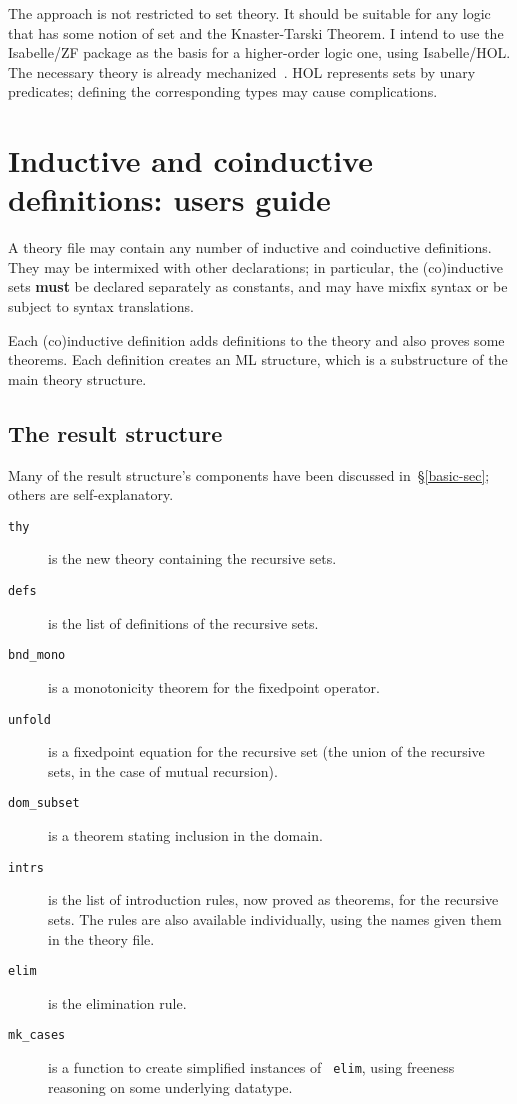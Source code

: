 The approach is not restricted to set theory.  It should be suitable for
any logic that has some notion of set and the Knaster-Tarski Theorem.  I
intend to use the Isabelle/ZF package as the basis for a higher-order logic
one, using Isabelle/HOL\@.  The necessary theory is already
mechanized~\cite{paulson-coind}.  HOL represents sets by unary predicates;
defining the corresponding types may cause complications.





\ifCADE{}
\else
\newpage
\appendix
\section{Inductive and coinductive definitions: users guide}
A theory file may contain any number of inductive and coinductive
definitions.  They may be intermixed with other declarations; in
particular, the (co)inductive sets {\bf must} be declared separately as
constants, and may have mixfix syntax or be subject to syntax translations.

Each (co)inductive definition adds definitions to the theory and also
proves some theorems.  Each definition creates an ML structure, which is a
substructure of the main theory structure.

\subsection{The result structure}
Many of the result structure's components have been discussed
in~\S\ref{basic-sec}; others are self-explanatory.
\begin{description}
\item[\tt thy] is the new theory containing the recursive sets.

\item[\tt defs] is the list of definitions of the recursive sets.

\item[\tt bnd\_mono] is a monotonicity theorem for the fixedpoint operator.

\item[\tt unfold] is a fixedpoint equation for the recursive set (the union of
the recursive sets, in the case of mutual recursion).

\item[\tt dom\_subset] is a theorem stating inclusion in the domain.

\item[\tt intrs] is the list of introduction rules, now proved as theorems, for
the recursive sets.  The rules are also available individually, using the
names given them in the theory file. 

\item[\tt elim] is the elimination rule.

\item[\tt mk\_cases] is a function to create simplified instances of {\tt
elim}, using freeness reasoning on some underlying datatype.
\end{description}

